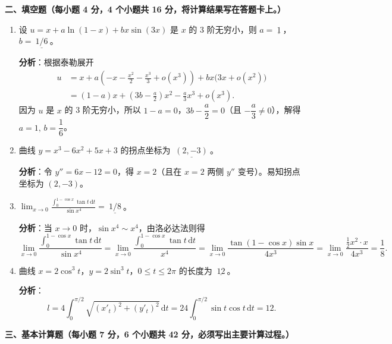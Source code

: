 \documentclass[a4paper,11pt]{ctexart}
\newcommand{\dd}{\,\mathrm{d}}
\begin{document}
\vspace{0.8em}

\textbf{二、填空题（每小题 4 分，4 个小题共 16 分，将计算结果写在答题卡上。）}

\begin{enumerate}[label=\arabic*., start=7, leftmargin=2em, itemsep=0.9em, topsep=0.6em]
  \item 设 $u=x+a\ln(1-x)+bx\sin(3x)$ 是 $x$ 的 3 阶无穷小，则 $a=\underline{\ 1\ }$，$b=\underline{\ 1/6\ }$。

  \textbf{分析}：根据泰勒展开
  \begin{align*}
    u &= x + a\left(-x-\frac{x^2}{2}-\frac{x^3}{3}+o(x^3)\right) + bx\bigl(3x+o(x^2)\bigr) \\
      &= (1-a)x + \left(3b-\frac{a}{2}\right)x^2 - \frac{a}{3}x^3 + o(x^3).
  \end{align*}
  因为 $u$ 是 $x$ 的 3 阶无穷小，所以 $1-a=0$，$3b-\dfrac{a}{2}=0$（且 $-\dfrac{a}{3}\neq 0$），解得 $a=1,\,b=\dfrac{1}{6}$。

  \item 曲线 $y=x^3-6x^2+5x+3$ 的拐点坐标为 $\underline{\ (2,-3)\ }$。

  \textbf{分析}：令 $y''=6x-12=0$，得 $x=2$（且在 $x=2$ 两侧 $y''$ 变号）。易知拐点坐标为 $(2,-3)$。

  \item $\displaystyle\lim_{x\to 0}\frac{\displaystyle\int_0^{1-\cos x}\tan t\dd t}{\sin x^4}=\underline{\ 1/8\ }$。

  \textbf{分析}：当 $x\to 0$ 时，$\sin x^4\sim x^4$，由洛必达法则得
  \[
    \lim_{x\to 0}\frac{\displaystyle\int_0^{1-\cos x}\tan t\dd t}{\sin x^4}
    = \lim_{x\to 0}\frac{\displaystyle\int_0^{1-\cos x}\tan t\dd t}{x^4}
    = \lim_{x\to 0}\frac{\tan(1-\cos x)\sin x}{4x^3}
    = \lim_{x\to 0}\frac{\frac{1}{2}x^2\cdot x}{4x^3}
    = \frac{1}{8}.
  \]

  \item 曲线 $x=2\cos^3 t$，$y=2\sin^3 t$，$0\le t\le 2\pi$ 的长度为 $\underline{\ 12\ }$。

  \textbf{分析}：
  \[
    l = 4\int_0^{\pi/2}\sqrt{(x'_t)^2+(y'_t)^2}\dd t = 24\int_0^{\pi/2}\sin t\cos t\dd t = 12.
  \]
\end{enumerate}

\vspace{0.8em}

\textbf{三、基本计算题（每小题 7 分，6 个小题共 42 分，必须写出主要计算过程。）}
\end{document}
